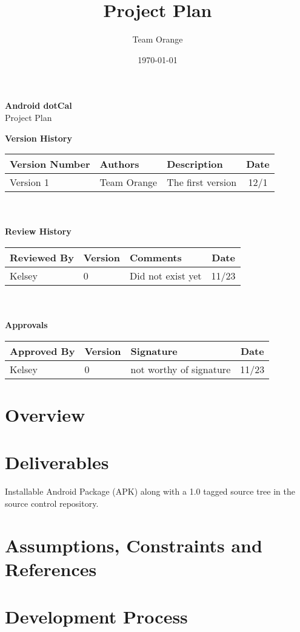 \documentclass[11pt]{article}
\title{Project Plan}
\author{Team Orange}
\date{\today}
\begin{document}
\begin{centering}
\textbf{\huge{Android dotCal}}\\
\LARGE{Project Plan}

\end{centering}


\vspace{1cm}
\textbf{\large{Version History}}

\begin{tabular}{|l|l|l|c|}
\hline
Version Number & Authors & Description & Date\\
\hline
Version 1 & Team Orange & The first version & 12/1 \\
\hline
\end{tabular}\\\\

\textbf{\large{Review History}}

\begin{tabular}{|l|l|l|c|}
\hline
Reviewed By & Version & Comments & Date\\
\hline
Kelsey & 0 & Did not exist yet & 11/23 \\
\hline
\end{tabular}\\\\

\textbf{\large{Approvals}}

\begin{tabular}{|l|l|l|c|}
\hline
Approved By & Version & Signature & Date\\
\hline
Kelsey & 0 & not worthy of signature & 11/23 \\
\hline
\end{tabular}


\section{Overview}
\section{Deliverables}
Installable Android Package (APK) along with a 1.0 tagged source tree in the source control repository.
\section{Assumptions, Constraints and References}
\section{Development Process}
\end{document}

